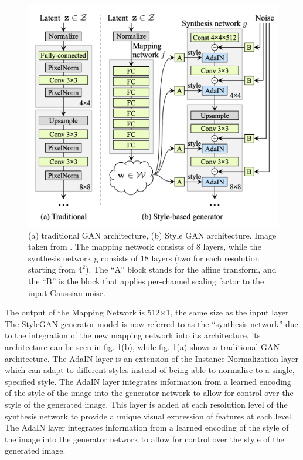 \begin{figure}[htbp]
\centering
  \includegraphics[scale=0.5]{figures/styleGAN-generator.png}
  \caption{(a) traditional GAN architecture, (b) Style GAN architecture. Image taken from \cite{StyleGAN}. The mapping network consists of 8 layers, while the synthesis network g consists of 18 layers (two for each resolution starting from $4^2$). The “A” block stands for the affine transform, and the “B” is the block that applies per-channel scaling factor to the input Gaussian noise.}
  \label{fig:StyleGAN architecture}
\end{figure}
The output of the Mapping Network is 512×1, the same size as the input layer. The StyleGAN generator model is now referred to as the “synthesis network” due to the integration of the new mapping network into its architecture, its architecture can be seen in fig. \ref{fig:StyleGAN architecture}(b), while fig. \ref{fig:StyleGAN architecture}(a) shows a traditional GAN architecture.
%
The AdaIN layer \cite{ArbitraryStyleTransfer} is an extension of the Instance Normalization layer which can adapt to different styles instead of being able to normalise to a single, specified style. The AdaIN layer integrates information from a learned encoding of the style of the image into the generator network to allow for control over the style of the generated image. This layer is added at each resolution level of the synthesis network to provide a unique visual expression of features at each level. The AdaIN layer integrates information from a learned encoding of the style of the image into the generator network to allow for control over the style of the generated image.
